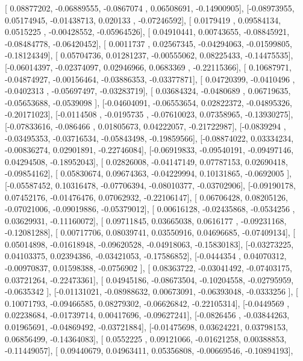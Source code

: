 \documentclass{article}
\begin{document}
       [ 0.08877202, -0.06889555, -0.0867074 ,  0.06508691, -0.14900905],
       [-0.08973955,  0.05174945, -0.01438713,  0.020133  , -0.07246592],
       [ 0.0179419 ,  0.09584134,  0.0515225 , -0.00428552, -0.05964526],
       [ 0.04910441,  0.00743655, -0.08845921, -0.08484778, -0.06420452],
       [ 0.0011737 ,  0.02567345, -0.04294063, -0.01599805, -0.18124349],
       [ 0.05704736,  0.01281237, -0.00555062,  0.08225433, -0.14475535],
       [-0.06014397, -0.02374097,  0.02946966,  0.0683369 , -0.22115366],
       [ 0.10687971, -0.04874927, -0.00156464, -0.03886353, -0.03377871],
       [ 0.04720399, -0.0410496 , -0.0402313 , -0.05697497, -0.03283719],
       [ 0.03684324, -0.0480689 ,  0.06719635, -0.05653688, -0.0539098 ],
       [-0.04604091, -0.06553654,  0.02822372, -0.04895326, -0.20171023],
       [-0.0114508 , -0.0195735 , -0.07610023,  0.07358965, -0.13930275],
       [-0.07833616, -0.086466  ,  0.01805673,  0.04222057, -0.21722987],
       [-0.0839294 , -0.03495353, -0.03716534, -0.05843498, -0.19859566],
       [-0.08874022,  0.03334234, -0.00836274,  0.02901891, -0.22746084],
       [-0.06919833, -0.09540191, -0.09497146,  0.04294508, -0.18952043],
       [ 0.02826008, -0.04147149,  0.07787153,  0.02690418, -0.09854162],
       [ 0.05830674,  0.09674363, -0.04229994,  0.10131865, -0.0692005 ],
       [-0.05587452,  0.10316478, -0.07706394, -0.08010377, -0.03702906],
       [-0.09190178,  0.07452176, -0.01476476,  0.07062932, -0.22106147],
       [ 0.06706428,  0.08205126, -0.07021006, -0.09019886, -0.05379012],
       [ 0.00616128, -0.02435868, -0.0534256 ,  0.03629931, -0.11160072],
       [ 0.09711845,  0.03665038,  0.0616177 , -0.09231168, -0.12081288],
       [ 0.00717706,  0.08039741,  0.03550916,  0.04696685, -0.07409134],
       [ 0.05014898, -0.01618948, -0.09620528, -0.04918063, -0.15830183],
       [-0.03273225,  0.04103375,  0.02394386, -0.03421053, -0.17586852],
       [-0.0444354 ,  0.04070312, -0.00970837,  0.01598388, -0.0756902 ],
       [ 0.08363722, -0.03041492, -0.07403175,  0.03721264, -0.22473361],
       [ 0.04945186, -0.08673504, -0.10204558, -0.02795959, -0.0635342 ],
       [-0.01131021, -0.08988632,  0.00673091, -0.06393048, -0.0333256 ],
       [ 0.10071793, -0.09466585,  0.08279302, -0.06626842, -0.22105314],
       [-0.0449569 ,  0.02238684, -0.01739714,  0.00417696, -0.09627241],
       [-0.0826456 , -0.03844263,  0.01965691, -0.04869492, -0.03721884],
       [-0.01475698,  0.03624221,  0.03798153,  0.06856499, -0.14364083],
       [ 0.0552225 ,  0.09121066, -0.01621258,  0.00388853, -0.11449057],
       [ 0.09440679,  0.04963411,  0.05356808, -0.00669546, -0.10894193],
\end{document}

